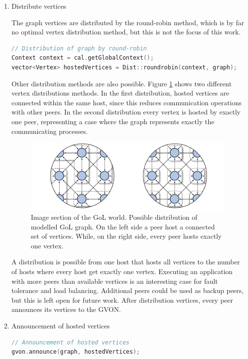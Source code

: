 \begin{enumerate}
\begin{enumerate}
\item Distribute vertices

  The graph vertices are distributed by the round-robin method, which
  is by far no optimal vertex distribution method, but this is not the
  focus of this work.

  \begin{lstlisting}[language=C++, label=lst:gol_distribution, caption={}]
// Distribution of graph by round-robin
Context context = cal.getGlobalContext();
vector<Vertex> hostedVertices = Dist::roundrobin(context, graph);
  \end{lstlisting}

  \noindent Other distribution methods are also possible. Figure
  \ref{fig:gol_mapping} shows two different vertex distributions
  methods.  In the first distribution, hosted vertices are connected
  within the same host, since this reduces communication operations
  with other peers.  In the second distribution every vertex is
  hosted by exactly one peer, representing a case where the graph
  represents exactly the communicating processes.

  \begin{figure}[H]
    \centering
    \includegraphics[width=\textwidth]{graphics/40_gol_mapping}
    \caption{Image section of the GoL world. Possible distribution of modelled
      GoL graph. On the left side a peer host a connected set of
      vertices. While, on the right side, every peer hosts exactly one
      vertex.}
    \label{fig:gol_mapping}
  \end{figure}

  \noindent A distribution is possible from one host that hosts all
  vertices to the number of hosts where every host get exactly one
  vertex. Executing an application with more peers than available
  vertices is an interesting case for fault tolerance and load
  balancing.  Additional peers could be used as backup peers, but this
  is left open for future work.  After distribution vertices, every
  peer announces its vertices to the GVON.

\item Announcement of hosted vertices
  \begin{lstlisting}[language=C++, label=lst:gol_announce, caption={\ }]
// Announcement of hosted vertices
gvon.announce(graph, hostedVertices);
  \end{lstlisting}
  \end{enumerate}
\end{enumerate}

